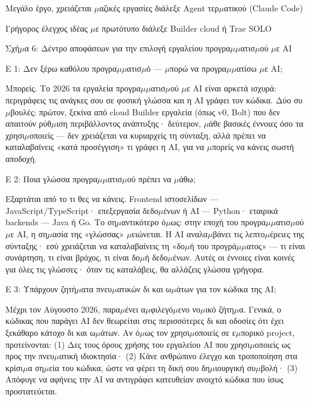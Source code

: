 Μεγάλο έργο, χρειάζεται $\mu$αζικές εργασίες διάλεξε Agent τερ$\mu$ατικού (Claude Code)

Γρήγορος έλεγχος ιδέας $\mu$ε πρωτότυπο διάλεξε Builder cloud ή Trae SOLO

\begin{center}\small\color{gray}Σχή$\mu$α 6: Δέντρο αποφάσεων για την επιλογή εργαλείου προγρα$\mu$$\mu$ατισ$\mu$ού $\mu$ε AI\end{center}


Ε 1: Δεν ξέρω καθόλου προγρα$\mu$$\mu$ατισ$\mu$ό — $\mu$πορώ να προγρα$\mu$$\mu$ατίσω $\mu$ε AI;

Μπορείς. Το 2026 τα εργαλεία προγρα$\mu$$\mu$ατισ$\mu$ού $\mu$ε AI είναι αρκετά ισχυρά: περιγράφεις τις ανάγκες σου σε φυσική γλώσσα και η AI γράφει τον κώδικα. Δύο συ$\mu$βουλές: πρώτον, ξεκίνα από cloud Builder εργαλεία (όπως v0, Bolt) που δεν απαιτούν ρύθ$\mu$ιση περιβάλλοντος ανάπτυξης· δεύτερον, $\mu$άθε βασικές έννοιες όσο τα χρησι$\mu$οποιείς — δεν χρειάζεται να κυριαρχείς τη σύνταξη, αλλά πρέπει να καταλαβαίνεις «κατά προσέγγιση» τι γράφει η AI, για να $\mu$πορείς να κάνεις σωστή αποδοχή.

Ε 2: Ποια γλώσσα προγρα$\mu$$\mu$ατισ$\mu$ού πρέπει να $\mu$άθω;

Εξαρτάται από το τι θες να κάνεις. Frontend ιστοσελίδων — JavaScript/TypeScript· επεξεργασία δεδο$\mu$ένων ή AI — Python· εταιρικά backends — Java ή Go. Το ση$\mu$αντικότερο ό$\mu$ως: στην εποχή του προγρα$\mu$$\mu$ατισ$\mu$ού $\mu$ε AI, η ση$\mu$ασία της «γλώσσας» $\mu$ειώνεται. Η AI αναλα$\mu$βάνει τις λεπτο$\mu$έρειες της σύνταξης· εσύ χρειάζεται να καταλαβαίνεις τη «δο$\mu$ή του προγρά$\mu$$\mu$ατος» — τι είναι συνάρτηση, τι είναι βρόχος, τι είναι δο$\mu$ή δεδο$\mu$ένων. Αυτές οι έννοιες είναι κοινές για όλες τις γλώσσες· όταν τις καταλάβεις, θα αλλάζεις γλώσσα γρήγορα.

Ε 3: Υπάρχουν ζητή$\mu$ατα πνευ$\mu$ατικών δι και ω$\mu$άτων για τον κώδικα της AI;

Μέχρι τον Αύγουστο 2026, παρα$\mu$ένει α$\mu$φιλεγό$\mu$ενο νο$\mu$ικό ζήτη$\mu$α. Γενικά, ο κώδικας που παράγει AI δεν θεωρείται στις περισσότερες δι και οδοσίες ότι έχει ξεκάθαρο κάτοχο δι και ω$\mu$άτων. Αν ό$\mu$ως τον χρησι$\mu$οποιείς σε ε$\mu$πορικό project, προτείνονται: (1) Δες τους όρους χρήσης του εργαλείου AI που χρησι$\mu$οποιείς ως προς την πνευ$\mu$ατική ιδιοκτησία· (2) Κάνε ανθρώπινο έλεγχο και τροποποίηση στα κρίσι$\mu$α ση$\mu$εία του κώδικα, ώστε να φέρει τη δική σου δη$\mu$ιουργική συ$\mu$βολή· (3) Απόφυγε να αφήνεις την AI να αντιγράφει κατευθείαν ανοιχτό κώδικα που ίσως προστατεύεται.

